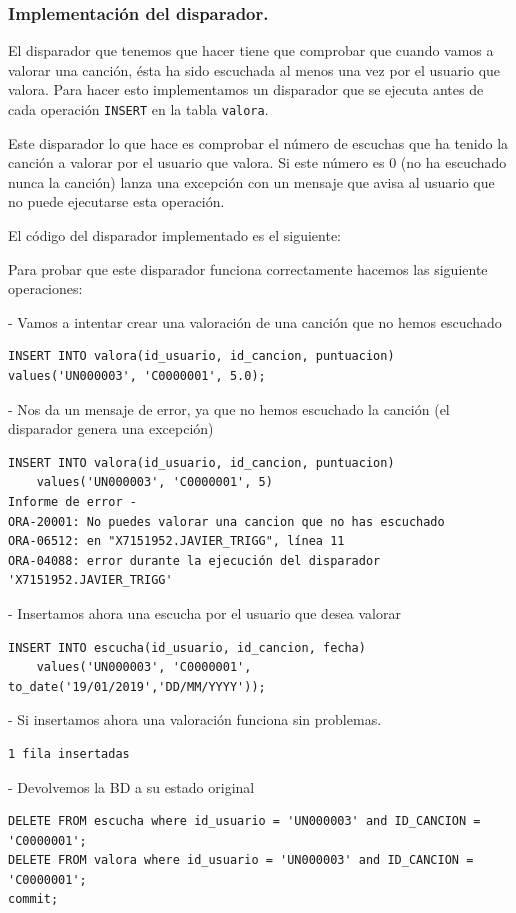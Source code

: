 \documentclass[12pt,a4paper]{article}
\begin{document}
\subsubsection{Implementación del disparador.}
El disparador que tenemos que hacer tiene que comprobar que cuando vamos a valorar una canción, ésta ha sido escuchada al menos una vez por el usuario que valora. Para hacer esto implementamos un disparador que se ejecuta antes de cada operación \texttt{INSERT} en la tabla \texttt{valora}.

Este disparador lo que hace es comprobar el número de escuchas que ha tenido la canción a valorar por el usuario que valora. Si este número es 0 (no ha escuchado nunca la canción) lanza una excepción con un mensaje que avisa al usuario que no puede ejecutarse esta operación.

El código del disparador implementado es el siguiente:



Para probar que este disparador funciona correctamente hacemos las siguiente operaciones:

- Vamos a intentar crear una valoración de una canción que no hemos escuchado
\begin{verbatim}
INSERT INTO valora(id_usuario, id_cancion, puntuacion) 
values('UN000003', 'C0000001', 5.0);
\end{verbatim}
- Nos da un mensaje de error, ya que no hemos escuchado la canción (el disparador genera una excepción)
\begin{verbatim}
INSERT INTO valora(id_usuario, id_cancion, puntuacion) 
	values('UN000003', 'C0000001', 5)
Informe de error -
ORA-20001: No puedes valorar una cancion que no has escuchado
ORA-06512: en "X7151952.JAVIER_TRIGG", línea 11
ORA-04088: error durante la ejecución del disparador 'X7151952.JAVIER_TRIGG'
\end{verbatim}

- Insertamos ahora una escucha por el usuario que desea valorar

\begin{verbatim}
INSERT INTO escucha(id_usuario, id_cancion, fecha) 
	values('UN000003', 'C0000001', to_date('19/01/2019','DD/MM/YYYY'));
\end{verbatim}
- Si insertamos ahora una valoración funciona sin problemas.
\begin{verbatim}
1 fila insertadas
\end{verbatim}

- Devolvemos la BD a su estado original
\begin{verbatim}
DELETE FROM escucha where id_usuario = 'UN000003' and ID_CANCION = 'C0000001';
DELETE FROM valora where id_usuario = 'UN000003' and ID_CANCION = 'C0000001';
commit;
\end{verbatim}
\end{document}
